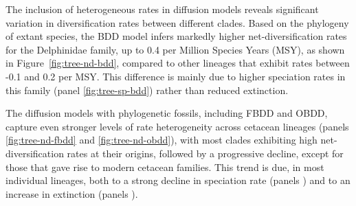 \documentclass[oupdraft]{sysbio}
\begin{document}
The inclusion of heterogeneous rates in diffusion models reveals significant variation in diversification rates between different clades. Based on the phylogeny of extant species, the BDD model infers markedly higher net-diversification rates for the Delphinidae family, up to 0.4 per Million Species Years (MSY), as shown in Figure~\ref{fig:tree-nd-bdd}, compared to other lineages that exhibit rates between -0.1 and 0.2 per MSY. This difference is mainly due to higher speciation rates in this family (panel \ref{fig:tree-sp-bdd}) rather than reduced extinction.

The diffusion models with phylogenetic fossils, including FBDD and OBDD, capture even stronger levels of rate heterogeneity across cetacean lineages (panels \ref{fig:tree-nd-fbdd} and \ref{fig:tree-nd-obdd}), with most clades exhibiting high net-diversification rates at their origins, followed by a progressive decline, except for those that gave rise to modern cetacean families. This trend is due, in most individual lineages, both to a strong decline in speciation rate (panels ) and to an increase in extinction (panels ).
\end{document}
